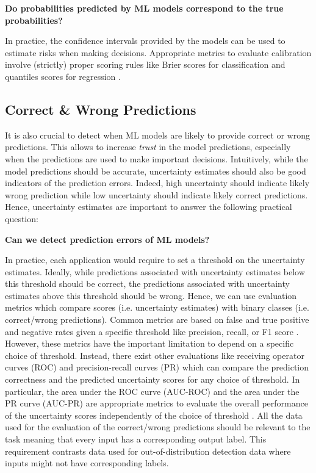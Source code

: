 \begin{center}
    \textbf{Do probabilities predicted by ML models correspond to the true probabilities?}
\end{center}

In practice, the confidence intervals provided by the models can be used to estimate risks when making decisions. Appropriate metrics to evaluate calibration involve (strictly) proper scoring rules like Brier scores for classification and quantiles scores for regression \cite{scoring-rules}.

\subsection{Correct \& Wrong Predictions}

It is also crucial to detect when ML models are likely to provide correct or wrong predictions. This allows to increase \emph{trust} in the model predictions, especially when the predictions are used to make important decisions. Intuitively, while the model predictions should be accurate, uncertainty estimates should also be good indicators of the prediction errors. Indeed, high uncertainty should indicate likely wrong prediction while low uncertainty should indicate likely correct predictions. Hence, uncertainty estimates are important to answer the following practical question:

\begin{center}
    \textbf{Can we detect prediction errors of ML models?}
\end{center}

In practice, each application would require to set a threshold on the uncertainty estimates. Ideally, while predictions associated with uncertainty estimates below this threshold should be correct, the predictions associated with uncertainty estimates above this threshold should be wrong. Hence, we can use evaluation metrics which compare scores (i.e. uncertainty estimates) with binary classes (i.e. correct/wrong predictions). Common metrics are based on false and true positive and negative rates given a specific threshold like precision, recall, or F1 score \cite{powers2011evaluation}. However, these metrics have the important limitation to depend on a specific choice of threshold. Instead, there exist other evaluations like receiving operator curves (ROC) and precision-recall curves (PR) which can compare the prediction correctness and the predicted uncertainty scores for any choice of threshold. In particular, the area under the ROC curve (AUC-ROC) and the area under the PR curve (AUC-PR) are appropriate metrics to evaluate the overall performance of the uncertainty scores independently of the choice of threshold \cite{apr_auroc}. All the data used for the evaluation of the correct/wrong predictions should be relevant to the task meaning that every input has a corresponding output label. This requirement contrasts data used for out-of-distribution detection data where inputs might not have corresponding labels.

